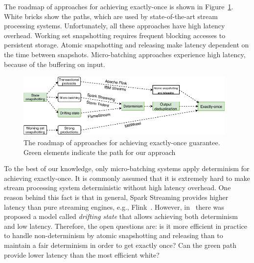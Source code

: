 The roadmap of approaches for achieving exactly-once is shown in Figure~\ref{roadmap}. White bricks show the paths, which are used by state-of-the-art stream processing systems. Unfortunately, all these approaches have high latency overhead. Working set snapshotting requires frequent blocking accesses to persistent storage. Atomic snapshotting and releasing make latency dependent on the time between snapshots. Micro-batching approaches experience high latency, because of the buffering on input.    

\begin{figure}[htbp]
  \centering
  \includegraphics[width=0.97\textwidth]{pics/roadmap}
  \caption{The roadmap of approaches for achieving exactly-once guarantee. Green elements indicate the path for our approach}
  \label {roadmap}
\end{figure} 

To the best of our knowledge, only micro-batching systems apply determinism for achieving exactly-once. It is commonly assumed that it is extremely hard to make stream processing system deterministic without high latency overhead. One reason behind this fact is that in general, Spark Streaming provides higher latency than pure streaming engines, e.g., Flink~\cite{karimov2018benchmarking}. However, in~\cite{we2018adbis} there was proposed a model called {\em drifting state} that allows achieving both determinism and low latency. Therefore, the open questions are: is it more efficient in practice to handle non-determinism by atomic snapshotting and releasing than to maintain a fair determinism in order to get exactly once? Can the green path provide lower latency than the most efficient white?